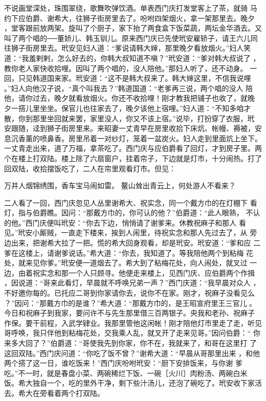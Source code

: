 不说画堂深处，珠围翠绕，歌舞吹弹饮酒。单表西门庆打发堂客上了茶，就骑
马约下应伯爵、谢希大，往狮子街房里去了。吩咐四架烟火，拿一架那里去。晚夕
，堂客跟前放两架。旋叫了个厨子，家下抬了两食盒下饭菜蔬，两坛金华酒去。又
叫了两个唱的──董娇儿、韩玉钏儿。原来西门庆已先使玳安雇轿子，请王六儿同
往狮子街房里去。玳安见妇人道：“爹说请韩大婶，那里晚夕看放烟火。”妇人笑
道：“我羞剌剌，怎么好去的，你韩大叔知道不嗔？”玳安道：“爹对韩大叔说了
，教你老人家快收拾哩。因叫了两个唱的，没人陪他。”那妇人听了，还不动身。
一回，只见韩道国来家。玳安道：“这不是韩大叔来了。韩大婶这里，不信我说哩
。”妇人向他汉子说，“真个叫我去？”韩道国道：“老爹再三说，两个唱的没人
陪他，请你过去，晚夕就看放烟火。你还不收拾哩！刚才教我把铺子也收了，就晚
夕一搭儿里坐坐。保官儿也往家去了，晚夕该他上宿哩。”妇人道：“不知多咱才
散，你到那里坐回就来罢，家里没人，你又不该上宿。”说毕，打扮穿了衣服，玳
安跟随，迳到狮子街房里来。来昭妻一丈青早在房里收拾下床炕、帐幔、褥被，安
息沉香薰的喷鼻香。房里吊着一对纱灯，笼着一盆炭火。妇人走到里面炕上坐下。
一丈青走出来，道了万福，拿茶吃了。西门庆与应伯爵看了回灯，才到房子里。两
个在楼上打双陆。楼上除了六扇窗户，挂着帘子，下边就是灯市，十分闹热。打了
回双陆，收拾摆饭吃了，二人在帘里观看灯市。但见：

万井人烟锦绣围，香车宝马闹如雷。
鳌山耸出青云上，何处游人不看来？

二人看了一回，西门庆忽见人丛里谢希大、祝实念，同一个戴方巾的在灯棚下
看灯，指与伯爵瞧。因问：“那戴方巾的，你可认的他？”伯爵道：“此人眼熟，
不认的他。”西门庆便叫玳安：“你去下边，悄悄请了谢爹来。休教祝麻子和那人
看见。”玳安小厮贼，一直走下楼来，挨到人闹里，待祝实念和那人先过去了，从
旁边出来，把谢希大拉了一把。慌的希大回身观看，却是玳安。玳安道：“爹和应
二爹在这楼上，请谢爹说话。”希大道：“你去，我知道了。等我陪他两个到粘梅
花处，就来见你爹。”玳安便一道烟去了。希大到了粘梅花处，向人闹处，就叉过
一边，由着祝实念和那一个人只顾寻。他便走来楼上，见西门庆、应伯爵两个作揖
，因说道：“哥来此看灯，早晨就不呼唤兄弟一声？”西门庆道：“我早晨对众人
，不好邀你每的。已托应二哥到你家请你去，说你不在家。刚才，祝麻子没看见么
？”因问：“那戴方巾的是谁？”希大道：“那戴方巾的，是王昭宣府里王三官儿
。今日和祝麻子到我家，要问许不与先生那里借三百两银子。央我和老孙、祝麻子
作保。要干前程，入武学肄业。我那里管他这闲帐！刚才陪他灯市里走了走，听见
哥呼唤，我只伴他到粘梅花处，交我乘人乱，就叉开了走来见哥。”因问伯爵：“
你来多大回了？”伯爵道：“哥使我先到你家，你不在，我就来了，和哥在这里打
了这回双陆。”西门庆问道：“你吃了饭不曾？”谢希大道：“早晨从哥那里出来
，和他两个搭了这一日，谁吃饭来！”西门庆吩咐玳安：“厨下安排饭来，与你谢
爹吃。”不一时，就是春盘小菜、两碗稀烂下饭、一碗［火川］肉粉汤、两碗白米
饭。希大独自一个，吃的里外干净，剩下些汁汤儿，还泡了碗吃了。玳安收下家活
去。希大在旁看着两个打双陆。

